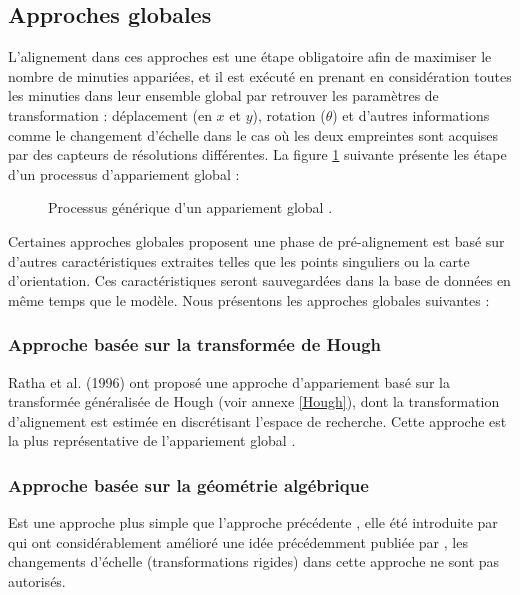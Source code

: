 \subsection{Approches globales }
L’alignement dans ces approches est une étape obligatoire afin de maximiser le nombre de minuties appariées, et il est exécuté en prenant en considération toutes les minuties dans leur ensemble global par retrouver les paramètres de transformation : déplacement (en $ x $ et $ y $), rotation ($ \theta $) et d’autres informations comme le changement d’échelle dans le cas où les deux empreintes sont acquises par des capteurs de résolutions différentes.
La figure \ref{fig:alignement} suivante présente les étape d'un processus d'appariement global : 
\begin{center}
	\begin{figure}[H]
		\centering
		\caption{Processus générique d'un appariement global \citep{Jianjiang2010Finger}.}
		\label{fig:alignement}
	\end{figure}
\end{center}

Certaines approches globales proposent une phase de pré-alignement est basé sur d'autres caractéristiques extraites telles que les points singuliers ou la carte d'orientation. Ces caractéristiques seront sauvegardées dans la base de données en même temps que le modèle. 
Nous présentons les approches globales suivantes : 
\subsubsection{Approche basée sur la transformée de Hough}
Ratha et al. (1996) ont proposé une approche d’appariement basé sur la transformée généralisée de Hough (voir annexe \ref{Hough}), dont la transformation d'alignement est estimée en discrétisant l’espace de recherche. Cette approche est la plus représentative de l'appariement global \citep{maltoni2009handbook}.

\subsubsection{Approche basée sur la géométrie algébrique}
Est une approche plus simple que l'approche précédente \citep{maltoni2009handbook}, elle été introduite par \citep{udupa2001fast} qui ont considérablement amélioré une idée précédemment publiée par  \citep{weber1992cost}, les changements d'échelle (transformations rigides) dans cette approche ne sont pas autorisés. 
